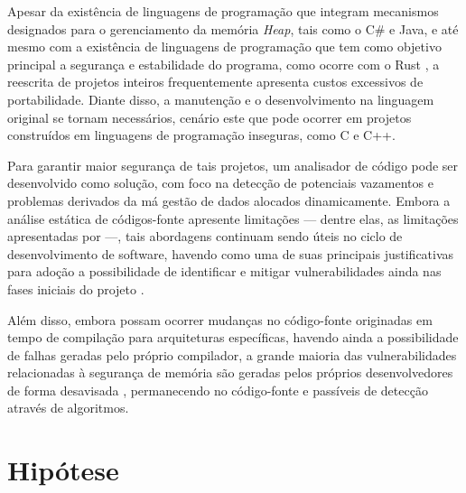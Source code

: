 \documentclass[
    12pt,                %
    openright,           %
    oneside,             %
    a4paper,             %
    english,             %
    brazil               %
]{abntex2}
\begin{document}
Apesar da existência de linguagens de programação que integram mecanismos designados para o gerenciamento da memória \textit{Heap}, tais como o C\# e Java, 
e até mesmo com a existência de linguagens de programação que tem como objetivo principal a segurança e estabilidade do programa, como ocorre com o Rust \cite{MSRC2019}, 
a reescrita de projetos inteiros frequentemente apresenta custos excessivos de portabilidade. Diante disso, a manutenção e o desenvolvimento na linguagem original se tornam necessários, 
cenário este que pode ocorrer em projetos construídos em linguagens de programação inseguras, como C e C++.
\par
Para garantir maior segurança de tais projetos, um analisador de código pode ser desenvolvido como solução, com foco na detecção de potenciais vazamentos e 
problemas derivados da má gestão de dados alocados dinamicamente. Embora a análise estática de códigos-fonte apresente limitações — dentre elas, as limitações apresentadas por  —, 
tais abordagens continuam sendo úteis no ciclo de desenvolvimento de software, havendo como uma de suas principais justificativas para adoção a possibilidade de identificar e mitigar vulnerabilidades 
ainda nas fases iniciais do projeto \cite{spa}. 
\par
Além disso, embora possam ocorrer mudanças no código-fonte originadas em tempo de compilação para arquiteturas específicas, havendo ainda a possibilidade de falhas geradas pelo próprio compilador, 
a grande maioria das vulnerabilidades relacionadas à segurança de memória são geradas pelos próprios desenvolvedores de forma desavisada \cite{MSRC2019}, permanecendo no código-fonte e passíveis de detecção 
através de algoritmos.


\section{Hipótese}
\label{sec:Hipotese}
\end{document}
